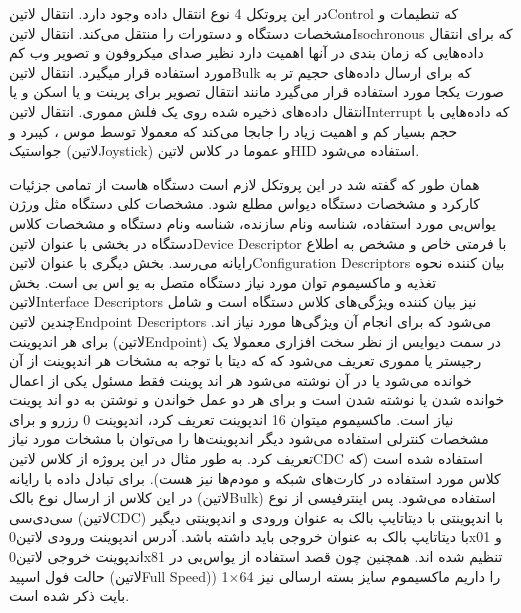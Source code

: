 در این پروتکل 4 نوع انتقال داده وجود دارد. انتقال ‌لاتین{Control} که تنطیمات و مشخصات دستگاه و دستورات را منتقل می‌کند. انتقال ‌لاتین{Isochronous} که برای انتقال داد‌ه‌هایی که زمان بندی در آنها اهمیت دارد نظیر صدای میکروفون و تصویر وب کم مورد استفاده قرار میگیرد. انتقال ‌لاتین{Bulk} که برای ارسال داده‌های حجیم تر به صورت یکجا مورد استفاده قرار می‌گیرد مانند انتقال تصویر برای پرینت و یا اسکن و یا انتقال داده‌های ذخیره شده روی یک فلش مموری. انتقال ‌لاتین{Interrupt} که داده‌هایی با حجم بسیار کم و اهمیت زیاد را جابجا می‌کند که معمولا توسط موس ، کیبرد و جواستیک (‌لاتین{Joystick}) و عموما در کلاس ‌لاتین{HID} استفاده می‌شود.

همان طور که گفته شد در این پروتکل لازم است دستگاه هاست از تمامی جزئیات کارکرد و مشخصات دستگاه دیواس مطلع شود. مشخصات کلی دستگاه مثل ورژن یو‌اس‌بی مورد استفاده، شناسه ونام سازنده، شناسه ونام دستگاه و مشخصات کلاس دستگاه در بخشی با عنوان ‌لاتین{Device Descriptor} با فرمتی خاص و مشخص به اطلاع رایانه می‌رسد. بخش دیگری با عنوان ‌لاتین{Configuration Descriptors} بیان کننده نحوه تغذیه و ماکسیموم توان مورد نیاز دستگاه متصل به یو اس بی است. بخش ‌لاتین{Interface Descriptors} نیز بیان کننده ویژگی‌های کلاس دستگاه است و شامل چندین ‌لاتین{Endpoint Descriptors} می‌شود که برای انجام آن ویژگی‌ها مورد نیاز اند. برای هر اندپوینت (‌لاتین{Endpoint}) در سمت دیوایس از نظر سخت افزاری معمولا یک رجیستر یا مموری تعریف می‌شود که که دیتا با توجه به مشخات هر اندپوینت از آن خوانده می‌شود یا در آن نوشته می‌شود هر اند پوینت فقط مسئول یکی از اعمال خوانده شدن یا نوشته شدن است و برای هر دو عمل خواندن و نوشتن به دو اند پوینت نیاز است. ماکسیموم میتوان 16 اندپوینت تعریف کرد، اندپوینت 0 رزرو و برای مشخصات کنترلی استفاده می‌شود دیگر اندپوینت‌ها را می‌توان با مشخات مورد نیاز تعریف کرد. به طور مثال در این پروژه از کلاس ‌لاتین{CDC} استفاده شده است (که کلاس مورد استفاده در کارت‌های شبکه و مودم‌ها نیز هست). برای تبادل داده با رایانه در این کلاس از ارسال نوع بالک (‌لاتین{Bulk}) استفاده می‌شود. پس اینترفیسی از نوع سی‌دی‌سی (‌لاتین{CDC}) با اندپوینتی با دیتاتایپ بالک به عنوان ورودی و اندپوینتی دیگیر با دیتاتایپ بالک به عنوان خروجی باید داشته باشد. آدرس اندپوینت ورودی ‌لاتین{0x01} و اندپوینت خروجی ‌لاتین{0x81} تنظیم شده اند. همچنین چون قصد استفاده از یو‌اس‌بی در حالت فول اسپید (‌لاتین{Full Speed)}) را داریم ماکسیموم سایز بسته ارسالی نیز 64$\times$1 بایت ذکر شده است. 


